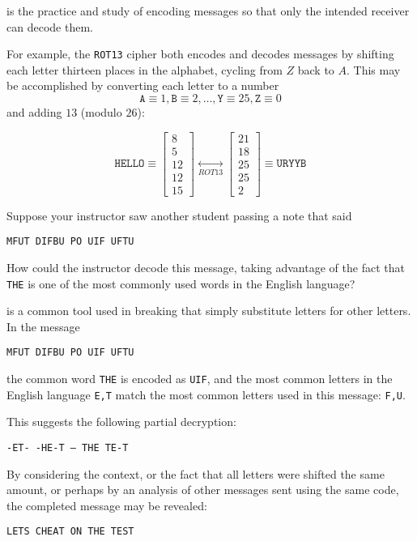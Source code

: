 
\begin{definition}
 is the practice and study of encoding messages
so that only the intended receiver can decode them.

For example, the \texttt{ROT13} cipher both encodes and decodes
messages by shifting each letter thirteen places in the alphabet,
cycling from \(Z\) back to \(A\). This may be accomplished by
converting each letter to a number 
\[
\mathtt{A}\equiv 1,\mathtt{B}\equiv 2,\dots,
\mathtt{Y}\equiv 25,\mathtt{Z}\equiv 0
\]
and adding \(13\) (modulo \(26\)):

\[
\mathtt{HELLO} \equiv
\begin{bmatrix}8\\5\\12\\12\\15\end{bmatrix}
\underset{ROT13}{\leftrightarrow}
\begin{bmatrix}21\\18\\25\\25\\2\end{bmatrix}
\equiv
\mathtt{URYYB}
\]
\end{definition}
 
\begin{activity}{10}
Suppose your instructor saw another student passing a note that said
\begin{center}\texttt{MFUT DIFBU PO UIF UFTU}\end{center}

How could the instructor decode this message, taking advantage of the 
fact that \texttt{THE} is one of the most commonly used words
in the English language?
\end{activity}

\begin{observation}
 is a common tool used in breaking
that simply substitute letters for other letters. In the message 
\begin{center}\texttt{MFUT DIFBU PO UIF UFTU}\end{center}
the common word \texttt{THE} is encoded as \texttt{UIF}, 
and the most common letters in the English language \texttt{E,T}
match the most common letters used in this message: \texttt{F,U}.

\vspace{1em}

This suggests the following partial decryption:
\begin{center}\texttt{-ET- -HE-T -- THE TE-T}\end{center}

By considering the context, or the fact that all letters
were shifted the same amount, 
or perhaps by an analysis of other messages
sent using the same code, the completed message may be revealed:
\begin{center}\texttt{LETS CHEAT ON THE TEST}\end{center}
\end{observation}

